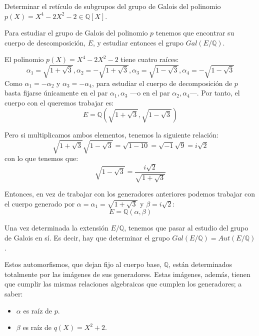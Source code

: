 \documentclass[a4paper, 11pt]{article}
\begin{document}
  \maketitle
  \begin{ejercicio}
     Determinar el retículo de subgrupos del grupo de Galois del polinomio $p(X) = X^4-2X^2-2 \in \mathbb{Q}[X]$.
  \end{ejercicio}

  \begin{solucion}
      Para estudiar el grupo de Galois del polinomio $p$ tenemos que encontrar su cuerpo de descomposición, $E$, y estudiar entonces el grupo $Gal(E/\mathbb{Q})$.

      El polinomio $p(X) = X^4-2X^2-2$ tiene cuatro raíces:
      \[
      \alpha_1 = \sqrt{1 + \sqrt{3}}, \alpha_2 = -\sqrt{1 + \sqrt{3}}, \alpha_3 = \sqrt{1 - \sqrt{3}}, \alpha_4 = -\sqrt{1 - \sqrt{3}}
      \]
      Como $\alpha_1 = -\alpha_2$ y $\alpha_3 = -\alpha_4$, para estudiar el cuerpo de decomposición de $p$ basta fijarse únicamente en el par $\alpha_1, \alpha_3$ ---o en el par $\alpha_2, \alpha_4$---. Por tanto, el cuerpo con el queremos trabajar es:
      \[
      E = \mathbb{Q}( \sqrt{1 + \sqrt{3}}, \sqrt{1 - \sqrt{3}})
      \]

      Pero si multiplicamos ambos elementos, tenemos la siguiente relación:
      \[
          \sqrt{1 + \sqrt{3}}\sqrt{1 - \sqrt{3}} = \sqrt{1-10} = \sqrt{-1}\sqrt{9} = i\sqrt{2}
      \]
      con lo que tenemos que:
      \begin{equation}
          \sqrt{1 - \sqrt{3}} = \frac{i\sqrt{2}}{\sqrt{1 + \sqrt{3}}} \label{relacion}
      \end{equation}

      Entonces, en vez de trabajar con los generadores anteriores podemos trabajar con el cuerpo generado por $\alpha = \alpha_1 = \sqrt{1 + \sqrt{3}}$ y $\beta = i\sqrt{2}$:
      \[
      E = \mathbb{Q}(\alpha,\beta)
      \]

      Una vez determinada la extensión $E/\mathbb{Q}$, tenemos que pasar al estudio del grupo de Galois en sí. Es decir, hay que determinar el grupo $Gal(E/\mathbb{Q}) = Aut(E/\mathbb{Q})$.

      Estos automorfismos, que dejan fijo al cuerpo base, $\mathbb{Q}$, están determinados totalmente por las imágenes de sus generadores. Estas imágenes, además, tienen que cumplir las mismas relaciones algebraicas que cumplen los generadores; a saber:
      \begin{itemize}
          \item $\alpha$ es raíz de $p$.
          \item $\beta$ es raíz de $q(X) = X^2 + 2$.
      \end{itemize}


\end{solucion}
\end{document}
